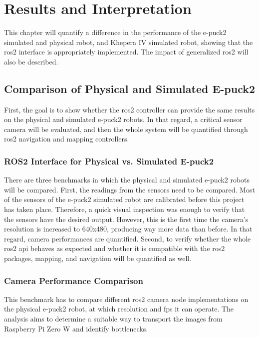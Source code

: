 \chapter{Results and Interpretation}
\label{chap:results}

This chapter will quantify a difference in the performance of the e-puck2 simulated and physical robot, and Khepera IV simulated robot, showing that the \ac{ros2} interface is appropriately implemented. 
The impact of generalized \ac{ros2} will also be described. 

\section{Comparison of Physical and Simulated E-puck2}

First, the goal is to show whether the \ac{ros2} controller can provide the same results on the physical and simulated e-puck2 robots.
In that regard, a critical sensor camera will be evaluated, and then the whole system will be quantified through \ac{ros2} navigation and mapping controllers.

\subsection{ROS2 Interface for Physical vs. Simulated E-puck2}

There are three benchmarks in which the physical and simulated e-puck2 robots will be compared.
First, the readings from the sensors need to be compared. Most of the sensors of the e-puck2 simulated robot are calibrated before this project has taken place.
Therefore, a quick visual inspection was enough to verify that the sensors have the desired output.
However, this is the first time the camera's resolution is increased to 640x480, producing way more data than before.
In that regard, camera performances are quantified.
Second, to verify whether the whole \ac{ros2} \ac{api} behaves as expected and whether it is compatible with the \ac{ros2} packages, mapping, and navigation will be quantified as well.


\subsection{Camera Performance Comparison}
This benchmark has to compare different \ac{ros2} camera node implementations on the physical e-puck2 robot, at which resolution and \ac{fps} it can operate.
The analysis aims to determine a suitable way to transport the images from Raspberry Pi Zero W and identify bottlenecks.

